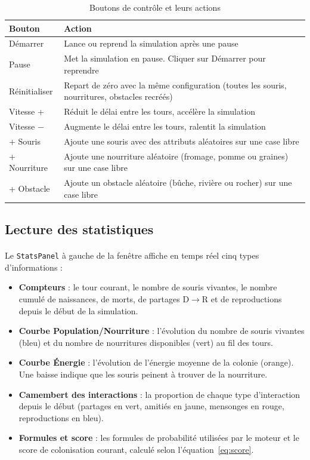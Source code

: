 \begin{table}[h!]
\centering
\renewcommand{\arraystretch}{1.4}
\begin{tabular}{|l|p{9cm}|}
\hline
\textbf{Bouton} & \textbf{Action} \\
\hline
Démarrer & Lance ou reprend la simulation après une pause \\
\hline
Pause & Met la simulation en pause. Cliquer sur Démarrer pour reprendre \\
\hline
Réinitialiser & Repart de zéro avec la même configuration (toutes les souris, nourritures, obstacles recréés) \\
\hline
Vitesse + & Réduit le délai entre les tours, accélère la simulation \\
\hline
Vitesse $-$ & Augmente le délai entre les tours, ralentit la simulation \\
\hline
+ Souris & Ajoute une souris avec des attributs aléatoires sur une case libre \\
\hline
+ Nourriture & Ajoute une nourriture aléatoire (fromage, pomme ou graines) sur une case libre \\
\hline
+ Obstacle & Ajoute un obstacle aléatoire (bûche, rivière ou rocher) sur une case libre \\
\hline
\end{tabular}
\caption{Boutons de contrôle et leurs actions}
\label{tab:controles_manuel}
\end{table}

\bigskip

\subsection{Lecture des statistiques}

\paragraph{} Le \texttt{StatsPanel} à gauche de la fenêtre affiche en temps réel cinq types d'informations :

\begin{itemize}
    \item \textbf{Compteurs} : le tour courant, le nombre de souris vivantes, le nombre cumulé de naissances, de morts, de partages D$\rightarrow$R et de reproductions depuis le début de la simulation.
    \item \textbf{Courbe Population/Nourriture} : l'évolution du nombre de souris vivantes (bleu) et du nombre de nourritures disponibles (vert) au fil des tours.
    \item \textbf{Courbe Énergie} : l'évolution de l'énergie moyenne de la colonie (orange). Une baisse indique que les souris peinent à trouver de la nourriture.
    \item \textbf{Camembert des interactions} : la proportion de chaque type d'interaction depuis le début (partages en vert, amitiés en jaune, mensonges en rouge, reproductions en bleu).
    \item \textbf{Formules et score} : les formules de probabilité utilisées par le moteur et le score de colonisation courant, calculé selon l'équation~\ref{eq:score}.
\end{itemize}

